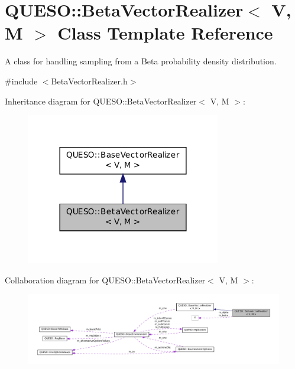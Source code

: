\hypertarget{class_q_u_e_s_o_1_1_beta_vector_realizer}{\section{Q\-U\-E\-S\-O\-:\-:Beta\-Vector\-Realizer$<$ V, M $>$ Class Template Reference}
\label{class_q_u_e_s_o_1_1_beta_vector_realizer}
}


A class for handling sampling from a Beta probability density distribution.  




{\ttfamily \#include $<$Beta\-Vector\-Realizer.\-h$>$}



Inheritance diagram for Q\-U\-E\-S\-O\-:\-:Beta\-Vector\-Realizer$<$ V, M $>$\-:
\nopagebreak
\begin{figure}[H]
\begin{center}
\leavevmode
\includegraphics[width=240pt]{class_q_u_e_s_o_1_1_beta_vector_realizer__inherit__graph}
\end{center}
\end{figure}


Collaboration diagram for Q\-U\-E\-S\-O\-:\-:Beta\-Vector\-Realizer$<$ V, M $>$\-:
\nopagebreak
\begin{figure}[H]
\begin{center}
\leavevmode
\includegraphics[width=350pt]{class_q_u_e_s_o_1_1_beta_vector_realizer__coll__graph}
\end{center}
\end{figure}
